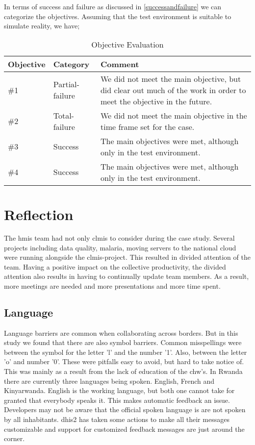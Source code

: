 In terms of success and failure as discussed in \ref{successandfailure} we can categorize the objectives. Assuming that the test environment is suitable to simulate reality, we have; 
\begin{table}
\centering
\begin{tabular}{p{2cm} p{3cm} p{6cm}}
\textbf{Objective} & \textbf{Category} & \textbf{Comment} \\
\hline
\hline
\#1 
& Partial-failure 
& We did not meet the main objective, but did clear out much of the work in order to meet the objective in the future.
\\
\hline
\#2 
& Total-failure 
& We did not meet the main objective in the time frame set for the case.
\\
\hline
\#3 
& Success 
& The main objectives were met, although only in the test environment.
\\
\hline
\#4 
& Success 
& The main objectives were met, although only in the test environment.
\\
\hline
\end{tabular}
\caption{Objective Evaluation}
\label{tab:obev}
\end{table}


\section{Reflection}
The \gls{hmis} team had not only \gls{clmis} to consider during the case study.
Several projects including data quality, malaria, moving servers to the national cloud were running alongside the \gls{clmis}-project. This resulted in divided attention of the team.
Having a positive impact on the collective productivity, the divided attention also results in having to continually update team members. As a result, more meetings are needed and more presentations and more time spent. 
\subsection{Language}
Language barriers are common when collaborating across borders. But in this study we found that there are also symbol barriers.
Common misspellings were between the symbol for the letter 'l' and the number '1'.
Also, between the letter 'o' and number '0'. 
These were pitfalls easy to avoid, but hard to take notice of.
This was mainly as a result from the lack of education of the \gls{chw}'s. 
In Rwanda there are currently three languages being spoken. English, French and Kinyarwanda.
English is the working language, but both one cannot take for granted that everybody speaks it.
This makes automatic feedback an issue. Developers may not be aware that the official spoken language is are not spoken by all inhabitants.
\gls{dhis2} has taken some actions to make all their messages customizable and support for customized feedback messages are just around the corner.

